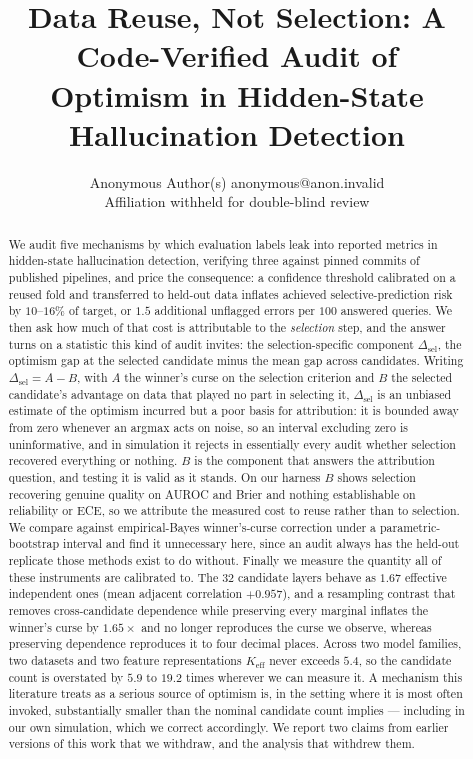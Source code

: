 \documentclass{article}
\title{Data Reuse, Not Selection: A Code-Verified Audit of\\
Optimism in Hidden-State Hallucination Detection}
\author{\name Anonymous Author(s) \email anonymous@anon.invalid \\
      \addr Affiliation withheld for double-blind review}
\begin{document}
\maketitle

\begin{abstract}
We audit five mechanisms by which evaluation labels leak into reported
metrics in hidden-state hallucination detection, verifying three against
pinned commits of published pipelines, and price the consequence: a
confidence threshold calibrated on a reused fold and transferred to held-out
data inflates achieved selective-prediction risk by $10$--$16\%$ of target,
or $1.5$ additional unflagged errors per $100$ answered queries. We then ask
how much of that cost is attributable to the \emph{selection} step, and the
answer turns on a statistic this kind of audit invites: the
selection-specific component $\Delta_{\text{sel}}$, the optimism gap at the
selected candidate minus the mean gap across candidates. Writing
$\Delta_{\text{sel}}=A-B$, with $A$ the winner's curse on the selection
criterion and $B$ the selected candidate's advantage on data that played no
part in selecting it, $\Delta_{\text{sel}}$ is an unbiased estimate of the
optimism incurred but a poor basis for attribution: it is bounded away from
zero whenever an argmax acts on noise, so an interval excluding zero is
uninformative, and in simulation it rejects in essentially every audit
whether selection recovered everything or nothing. $B$ is the component that
answers the attribution question, and testing it is valid as it stands. On
our harness $B$ shows selection recovering genuine quality on AUROC and
Brier and nothing establishable on reliability or ECE, so we attribute the
measured cost to reuse rather than to selection. We compare against
empirical-Bayes winner's-curse correction under a parametric-bootstrap
interval and find it unnecessary here, since an audit always has the held-out
replicate those methods exist to do without. Finally we measure the quantity
all of these instruments are calibrated to. The $32$ candidate layers behave
as $1.67$ effective independent ones (mean adjacent correlation $+0.957$), and
a resampling contrast that removes cross-candidate dependence while preserving
every marginal inflates the winner's curse by $1.65\times$ and no longer
reproduces the curse we observe, whereas preserving dependence reproduces it
to four decimal places. Across two model families, two datasets and two feature
representations $K_{\text{eff}}$ never exceeds $5.4$, so the candidate count
is overstated by $5.9$ to $19.2$ times wherever we can measure it. A mechanism
this literature treats as a serious source of optimism is, in the setting
where it is most often invoked, substantially smaller than the nominal
candidate count implies --- including in our own simulation, which we correct
accordingly. We report two claims from
earlier versions of this work that we withdraw, and the analysis that
withdrew them.
\end{abstract}
\end{document}
